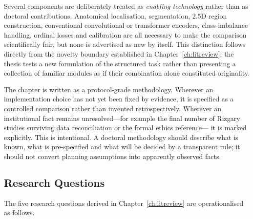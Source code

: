 Several components are deliberately treated as \emph{enabling technology}
rather than as doctoral contributions. Anatomical localisation, segmentation,
2.5D region construction, conventional convolutional or transformer encoders,
class-imbalance handling, ordinal losses and calibration are all necessary to
make the comparison scientifically fair, but none is advertised as new by
itself. This distinction follows directly from the novelty boundary established
in Chapter~\ref{ch:litreview}: the thesis tests a new formulation of the
structured task rather than presenting a collection of familiar modules as if
their combination alone constituted originality.

The chapter is written as a protocol-grade methodology. Wherever an
implementation choice has not yet been fixed by evidence, it is specified as a
controlled comparison rather than invented retrospectively. Wherever an
institutional fact remains unresolved---for example the final number of
Rizgary studies surviving data reconciliation or the formal ethics reference---
it is marked explicitly. This is intentional. A doctoral methodology should
describe what is known, what is pre-specified and what will be decided by a
transparent rule; it should not convert planning assumptions into apparently
observed facts.

\subsection{Research Questions}
\label{sec:method-rqs}

The five research questions derived in Chapter~\ref{ch:litreview} are
operationalised as follows.

